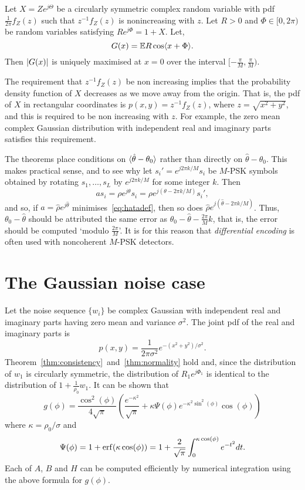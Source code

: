 \documentclass[conference]{IEEEtran}
\begin{document}
\begin{lemma}
Let $X = Z e^{j\Theta}$ be a circularly symmetric complex random variable with pdf $\tfrac{1}{2\pi}f_Z(z)$ such that $z^{-1} f_Z(z)$ is nonincreasing with $z$.  Let $R > 0$ and $\Phi \in [0, 2\pi)$ be random variables satisfying $R e^{j\Phi} = 1 + X$.  Let,
\[
G(x) = {\mathbb E} R \cos\langle x + \Phi \rangle.
\]
Then ${\left\vert G(x) \right\vert}$ is uniquely maximised at $x=0$ over the interval $[-\tfrac{\pi}{M},\tfrac{\pi}{M})$.
\end{lemma}

The requirement that $z^{-1}f_{Z}(z)$ be non increasing implies that the probability density function of $X$ decreases as we move away from the origin. That is, the pdf of $X$ in rectangular coordinates is $p(x,y) = z^{-1}f_{Z}(z)$, where $z = \sqrt{x^2 + y^2}$, and this is required to be non increasing with $z$.  For example, the zero mean complex Gaussian distribution with independent real and imaginary parts satisfies this requirement.

The theorems place conditions on $\langle \hat{\theta} - \theta_0 \rangle$ rather than directly on $\hat{\theta} - \theta_0$.  This makes practical sense, and to see why let $s_i' = e^{j2\pi k/M}s_i$ be $M$-PSK symbols obtained by rotating $s_1, \dots, s_L$ by $e^{j2\pi k/M}$ for some integer $k$.  Then
\[
a s_i =  \rho e^{j\theta}s_i = \rho e^{j(\theta - 2\pi k/M)} s_i',
\]
and so, if $a = \hat{\rho}e^{j\hat{\theta}}$ minimises~\eqref{eq:hatadef}, then so does $\hat{\rho} e^{j(\hat{\theta} - 2\pi k/M)}$.  Thus, $\theta_0 - \hat{\theta}$ should be attributed the same error as $\theta_0 - \hat{\theta} - \tfrac{2\pi}{M}k$, that is, the error should be computed `modulo $\tfrac{2\pi}{M}$'.  It is for this reason that \emph{differential encoding} is often used with noncoherent $M$-PSK  detectors. 


\section{The Gaussian noise case}\label{sec:gaussian-noise-case}

Let the noise sequence $\{w_i\}$ be complex Gaussian with independent real and imaginary parts having zero mean and variance $\sigma^2$.  The joint pdf of the real and imaginary parts is
\[
p(x,y) = \frac{1}{2\pi\sigma^2}e^{-(x^2 + y^2)/\sigma^2}.
\]
Theorem~\ref{thm:consistency}~and~\ref{thm:normality} hold and, since the distribution of $w_1$ is circularly symmetric, the distribution of $R_1e^{j\Phi_1}$ is identical to the distribution of $1 + \frac{1}{\rho_0} w_1$.
It can be shown that
\[
g(\phi) = \frac{\cos^2(\phi)}{4\sqrt{\pi}}\left( \frac{e^{-\kappa^2} }{\sqrt{\pi}} + \kappa \Psi(\phi)  e^{-\kappa^2\sin^2(\phi)}\cos(\phi) \right)
\]
where $\kappa = \rho_0/\sigma$ and
\vspace{-0.1cm}
\[
\Psi(\phi) = 1 + \operatorname{erf}(\kappa \cos(\phi)) = 1 + \frac{2}{\sqrt{\pi}}\int_0^{\kappa \cos(\phi)} e^{-t^2} dt.
\]
Each of $A$, $B$ and $H$ can be computed efficiently by numerical integration using the above formula for $g(\phi)$.
\end{document}
